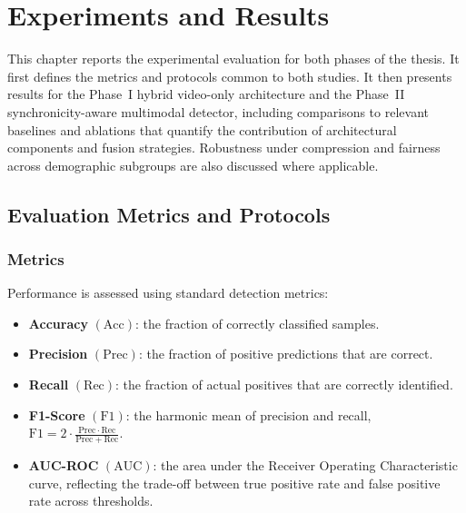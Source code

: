\chapter{Experiments and Results}
\label{ch:experiments}

This chapter reports the experimental evaluation for both phases of the thesis. It first defines the metrics and protocols common to both studies. It then presents results for the Phase~I hybrid video-only architecture and the Phase~II synchronicity-aware multimodal detector, including comparisons to relevant baselines and ablations that quantify the contribution of architectural components and fusion strategies. Robustness under compression and fairness across demographic subgroups are also discussed where applicable.

\section{Evaluation Metrics and Protocols}
\subsection{Metrics}
Performance is assessed using standard detection metrics:
\begin{itemize}
    \item \textbf{Accuracy} $(\mathrm{Acc})$: the fraction of correctly classified samples.
    \item \textbf{Precision} $(\mathrm{Prec})$: the fraction of positive predictions that are correct.
    \item \textbf{Recall} $(\mathrm{Rec})$: the fraction of actual positives that are correctly identified.
    \item \textbf{F1-Score} $(\mathrm{F1})$: the harmonic mean of precision and recall, $\mathrm{F1} = 2 \cdot \frac{\mathrm{Prec}\cdot\mathrm{Rec}}{\mathrm{Prec}+\mathrm{Rec}}$.
    \item \textbf{AUC-ROC} $(\mathrm{AUC})$: the area under the Receiver Operating Characteristic curve, reflecting the trade-off between true positive rate and false positive rate across thresholds.
\end{itemize}

